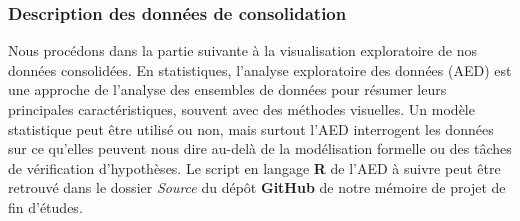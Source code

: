 	\subsubsection{Description des données de consolidation}
	Nous procédons dans la partie suivante à la visualisation exploratoire de nos données consolidées. En statistiques, l'analyse exploratoire des données (AED) est une approche de l'analyse des ensembles de données pour résumer leurs principales caractéristiques, souvent avec des méthodes visuelles. Un modèle statistique peut être utilisé ou non, mais surtout l'AED interrogent les données sur ce qu'elles peuvent nous dire au-delà de la modélisation formelle ou des tâches de vérification d'hypothèses. Le script en langage \textbf{R} de l'AED à suivre peut être retrouvé dans le dossier \textit{Source} du dépôt \textbf{GitHub} de notre mémoire de projet de fin d'études\cite{this}.
